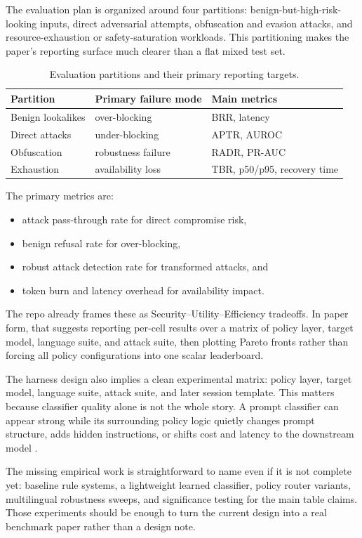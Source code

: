 The evaluation plan is organized around four partitions: benign-but-high-risk-looking inputs, direct adversarial attempts, obfuscation and evasion attacks, and resource-exhaustion or safety-saturation workloads. This partitioning makes the paper's reporting surface much clearer than a flat mixed test set.

\begin{table}[t]
\centering
\small
\begin{tabular}{lll}
\toprule
Partition & Primary failure mode & Main metrics \\
\midrule
Benign lookalikes & over-blocking & BRR, latency \\
Direct attacks & under-blocking & APTR, AUROC \\
Obfuscation & robustness failure & RADR, PR-AUC \\
Exhaustion & availability loss & TBR, p50/p95, recovery time \\
\bottomrule
\end{tabular}
\caption{Evaluation partitions and their primary reporting targets.}
\end{table}

The primary metrics are:

\begin{itemize}[leftmargin=1.5em]
  \item attack pass-through rate for direct compromise risk,
  \item benign refusal rate for over-blocking,
  \item robust attack detection rate for transformed attacks, and
  \item token burn and latency overhead for availability impact.
\end{itemize}

The repo already frames these as Security--Utility--Efficiency tradeoffs. In paper form, that suggests reporting per-cell results over a matrix of policy layer, target model, language suite, and attack suite, then plotting Pareto fronts rather than forcing all policy configurations into one scalar leaderboard.

The harness design also implies a clean experimental matrix: policy layer, target model, language suite, attack suite, and later session template. This matters because classifier quality alone is not the whole story. A prompt classifier can appear strong while its surrounding policy logic quietly changes prompt structure, adds hidden instructions, or shifts cost and latency to the downstream model \citep{shibbolethdraft2026}.

The missing empirical work is straightforward to name even if it is not complete yet: baseline rule systems, a lightweight learned classifier, policy router variants, multilingual robustness sweeps, and significance testing for the main table claims. Those experiments should be enough to turn the current design into a real benchmark paper rather than a design note.
